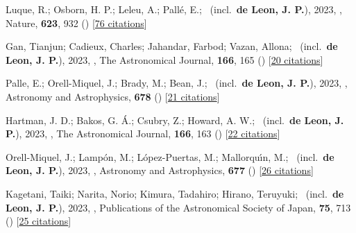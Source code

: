 \item[{\color{numcolor}\scriptsize57}] Luque, R.; Osborn, H. P.; Leleu, A.; Pall{\'e}, E.; \etal\ (incl.\ \textbf{de Leon, J. P.}), 2023, , Nature, \textbf{623}, 932 () [\href{https://ui.adsabs.harvard.edu/abs/2023Natur.623..932L}{76 citations}]

\item[{\color{numcolor}\scriptsize56}] Gan, Tianjun; Cadieux, Charles; Jahandar, Farbod; Vazan, Allona; \etal\ (incl.\ \textbf{de Leon, J. P.}), 2023, , The Astronomical Journal, \textbf{166}, 165 () [\href{https://ui.adsabs.harvard.edu/abs/2023AJ....166..165G}{20 citations}]

\item[{\color{numcolor}\scriptsize55}] Palle, E.; Orell-Miquel, J.; Brady, M.; Bean, J.; \etal\ (incl.\ \textbf{de Leon, J. P.}), 2023, , Astronomy and Astrophysics, \textbf{678} () [\href{https://ui.adsabs.harvard.edu/abs/2023A&A...678A..80P}{21 citations}]

\item[{\color{numcolor}\scriptsize54}] Hartman, J. D.; Bakos, G. {\'A}.; Csubry, Z.; Howard, A. W.; \etal\ (incl.\ \textbf{de Leon, J. P.}), 2023, , The Astronomical Journal, \textbf{166}, 163 () [\href{https://ui.adsabs.harvard.edu/abs/2023AJ....166..163H}{22 citations}]

\item[{\color{numcolor}\scriptsize53}] Orell-Miquel, J.; Lamp{\'o}n, M.; L{\'o}pez-Puertas, M.; Mallorqu{\'\i}n, M.; \etal\ (incl.\ \textbf{de Leon, J. P.}), 2023, , Astronomy and Astrophysics, \textbf{677} () [\href{https://ui.adsabs.harvard.edu/abs/2023A&A...677A..56O}{26 citations}]

\item[{\color{numcolor}\scriptsize52}] Kagetani, Taiki; Narita, Norio; Kimura, Tadahiro; Hirano, Teruyuki; \etal\ (incl.\ \textbf{de Leon, J. P.}), 2023, , Publications of the Astronomical Society of Japan, \textbf{75}, 713 () [\href{https://ui.adsabs.harvard.edu/abs/2023PASJ...75..713K}{25 citations}]

